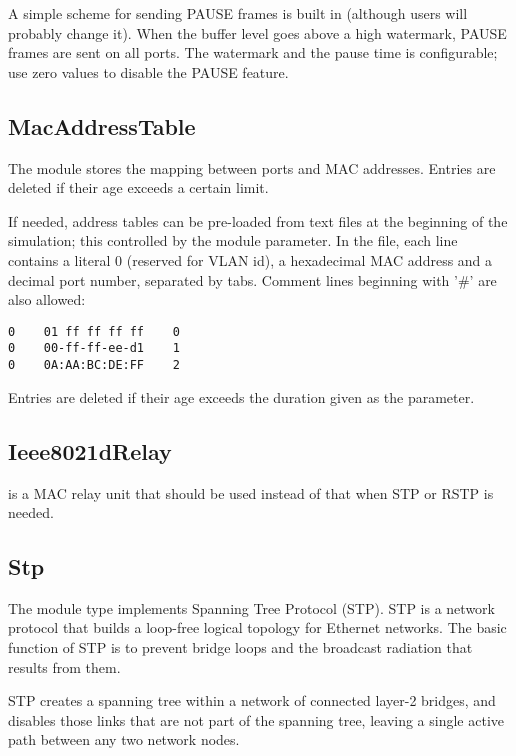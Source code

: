 A simple scheme for sending PAUSE frames is built in (although
users will probably change it). When the buffer level goes
above a high watermark, PAUSE frames are sent on all ports.
The watermark and the pause time is configurable; use zero
values to disable the PAUSE feature.

\subsection{MacAddressTable}
\label{sec:ethernet:macaddresstable}

The  module stores the mapping between ports and MAC addresses.
Entries are deleted if their age exceeds a certain limit.

If needed, address tables can be pre-loaded from text files at the beginning of
the simulation; this controlled by the  module parameter.
In the file, each line contains a literal 0 (reserved for VLAN id), a hexadecimal
MAC address and a decimal port number, separated by tabs. Comment lines
beginning with '\#' are also allowed:

\begin{verbatim}
0    01 ff ff ff ff    0
0    00-ff-ff-ee-d1    1
0    0A:AA:BC:DE:FF    2
\end{verbatim}

Entries are deleted if their age exceeds the duration given as the  parameter.


\subsection{Ieee8021dRelay}
\label{sec:ethernet:ieee8021drelay}

 is a MAC relay unit that should be used instead
of  that when STP or RSTP is needed.

\subsection{Stp}
\label{sec:ethernet:stp}

The  module type implements Spanning Tree Protocol (STP). STP
is a network protocol that builds a loop-free logical topology for Ethernet
networks. The basic function of STP is to prevent bridge loops and the broadcast
radiation that results from them.

STP creates a spanning tree within a network of connected layer-2 bridges, and
disables those links that are not part of the spanning tree, leaving a single
active path between any two network nodes.


